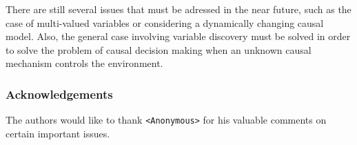 \documentclass[letterpaper]{article}
\begin{document}
There are still several issues that must be adressed in the near future, such as the case of multi-valued variables or considering a dynamically changing causal model. Also, the general case involving variable discovery must be solved in order to solve the problem of causal decision making when an unknown causal mechanism controls the environment. 

\subsubsection*{Acknowledgements}
The authors would like to thank \texttt{<Anonymous>} for his valuable comments on certain important issues.



\end{document}
